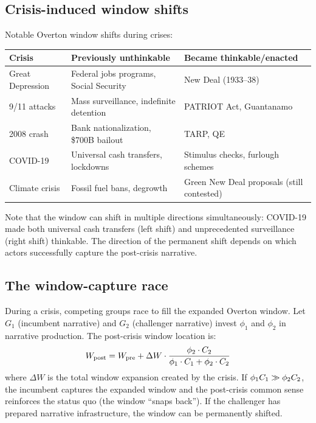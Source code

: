 \subsection{Crisis-induced window shifts}

\begin{example}
\label{ex:overton-shifts}
Notable Overton window shifts during crises:

\begin{center}
\begin{tabular}{p{3cm}p{4cm}p{4.5cm}}
\toprule
Crisis & Previously unthinkable & Became thinkable/enacted \\
\midrule
Great Depression & Federal jobs programs, Social Security & New Deal (1933--38) \\[3pt]
9/11 attacks & Mass surveillance, indefinite detention & PATRIOT Act, Guantanamo \\[3pt]
2008 crash & Bank nationalization, \$700B bailout & TARP, QE \\[3pt]
COVID-19 & Universal cash transfers, lockdowns & Stimulus checks, furlough schemes \\[3pt]
Climate crisis & Fossil fuel bans, degrowth & Green New Deal proposals (still contested) \\
\bottomrule
\end{tabular}
\end{center}

Note that the window can shift in multiple directions simultaneously: COVID-19 made both universal cash transfers (left shift) and unprecedented surveillance (right shift) thinkable.
The direction of the permanent shift depends on which actors successfully capture the post-crisis narrative.
\end{example}

\subsection{The window-capture race}

\begin{model}
\label{mod:overton-capture}
During a crisis, competing groups race to fill the expanded Overton window.
Let $G_1$ (incumbent narrative) and $G_2$ (challenger narrative) invest $\phi_1$ and $\phi_2$ in narrative production.
The post-crisis window location is:
\[
  W_{\text{post}} = W_{\text{pre}} + \Delta W \cdot \frac{\phi_2 \cdot C_{2}}{\phi_1 \cdot C_{1} + \phi_2 \cdot C_{2}}
\]
where $\Delta W$ is the total window expansion created by the crisis.
If $\phi_1 C_{1} \gg \phi_2 C_{2}$, the incumbent captures the expanded window and the post-crisis common sense reinforces the status quo (the window ``snaps back'').
If the challenger has prepared narrative infrastructure, the window can be permanently shifted.
\end{model}

